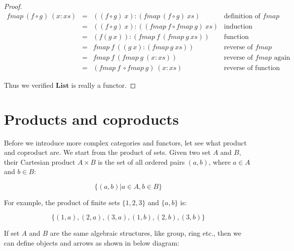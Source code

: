 \documentclass{article}
\begin{document}
\begin{example}
\begin{mdframed}
\begin{proof}
\[
\begin{array}{rcll}
fmap\ (f \circ g)\ (x:xs) & = & ((f \circ g)\ x):(fmap\ (f \circ g)\ xs) & \text{definition of $fmap$} \\
  & = & ((f \circ g)\ x):((fmap\ f \circ fmap\ g)\ xs) & \text{induction assumption} \\
  & = & (f(g\ x)):(fmap\ f\ (fmap\ g\ xs)) & \text{function composition} \\
  & = & fmap\ f\ ((g\ x):(fmap\ g\ xs)) & \text{reverse of $fmap$} \\
  & = & fmap\ f\ (fmap\ g\ (x:xs)) & \text{reverse of $fmap$ again} \\
  & = & (fmap\ f\ \circ fmap\ g)\ (x:xs) & \text{reverse of function composition}
\end{array}
\]

Thus we verified $\mathbf{List}$ is really a functor.
\end{proof}
\end{mdframed}
\end{example}

\begin{Exercise}
\end{Exercise}

\section{Products and coproducts}

Before we introduce more complex categories and functors, let see what product and coproduct are. We start from the product of sets. Given two set $A$ and $B$, their Cartesian product $A \times B$ is the set of all ordered pairs $(a, b)$, where $a \in A$ and $b \in B$:

\[
\{(a, b) | a \in A, b \in B\}
\]

For example, the product of finite sets $\{1, 2, 3\}$ and $\{a, b\}$ is:

\[
\{(1, a), (2, a), (3, a), (1, b), (2, b), (3, b)\}
\]

If set $A$ and $B$ are the same algebraic structures, like group, ring etc., then we can define objects and arrows as shown in below diagram:
\end{document}

